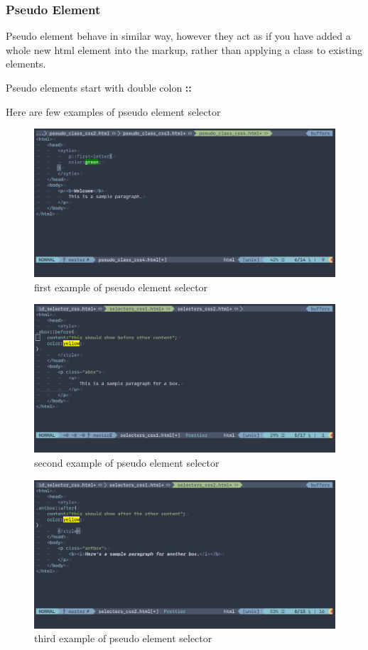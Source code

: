 \documentclass[a4paper,1pt,oneside]{article}
\begin{document}
\subsubsection{Pseudo Element}

Pseudo element behave in similar way, however they act as if you have added a whole new html element into the markup, rather than applying a class to existing elements.

Pseudo elements start with double colon \textbf{::}

Here are few examples of pseudo element selector

\begin{figure}[hbt!]
	\centering
	\includegraphics[width=1\textwidth]{images/2020-03-23-232348_996x491_scrot.png}
	\caption{first example of pseudo element selector}
\end{figure}

\begin{figure}[hbt!]
	\centering
	\includegraphics[width=1\textwidth]{images/2020-03-23-233647_996x491_scrot.png}
	\caption{second example of pseudo element selector}
\end{figure}

\begin{figure}[hbt!]
	\centering
	\includegraphics[width=1\textwidth]{images/2020-03-23-233736_996x491_scrot.png}
	\caption{third example of pseudo element selector}
\end{figure}
\end{document}
